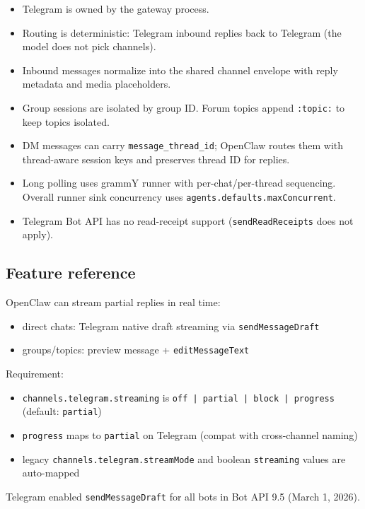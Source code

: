 \begin{itemize}
  \item Telegram is owned by the gateway process.
  \item Routing is deterministic: Telegram inbound replies back to Telegram (the model does not pick channels).
  \item Inbound messages normalize into the shared channel envelope with reply metadata and media placeholders.
  \item Group sessions are isolated by group ID. Forum topics append \texttt{:topic:} to keep topics isolated.
  \item DM messages can carry \texttt{message\_thread\_id}; OpenClaw routes them with thread-aware session keys and preserves thread ID for replies.
  \item Long polling uses grammY runner with per-chat/per-thread sequencing. Overall runner sink concurrency uses \texttt{agents.defaults.maxConcurrent}.
  \item Telegram Bot API has no read-receipt support (\texttt{sendReadReceipts} does not apply).
\end{itemize}


\subsection{Feature reference}


OpenClaw can stream partial replies in real time:

\begin{itemize}
  \item direct chats: Telegram native draft streaming via \texttt{sendMessageDraft}
  \item groups/topics: preview message + \texttt{editMessageText}
\end{itemize}


Requirement:

\begin{itemize}
  \item \texttt{channels.telegram.streaming} is \texttt{off | partial | block | progress} (default: \texttt{partial})
  \item \texttt{progress} maps to \texttt{partial} on Telegram (compat with cross-channel naming)
  \item legacy \texttt{channels.telegram.streamMode} and boolean \texttt{streaming} values are auto-mapped
\end{itemize}


Telegram enabled \texttt{sendMessageDraft} for all bots in Bot API 9.5 (March 1, 2026).

